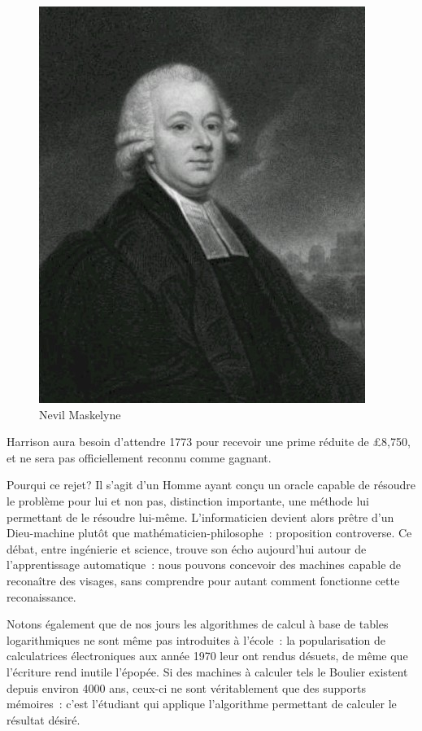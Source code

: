 \begin{minipage}[H]{0.49\linewidth}
  \begin{figure}[H]
  \centering
  \includegraphics[height=0.15\paperheight]{../resources/illustrations/maskelyne}
  \caption{Nevil Maskelyne}
  \end{figure}
\end{minipage}

Harrison aura besoin d'attendre 1773 pour recevoir une prime réduite de \pounds{8,750}, et ne sera pas officiellement reconnu comme gagnant.

Pourqui ce rejet? Il s'agit d'un Homme ayant conçu un \og{}oracle\fg{} capable de résoudre le problème pour lui et non pas, distinction importante, une méthode lui permettant de le résoudre lui-même. L'informaticien devient alors prêtre d'un Dieu-machine plutôt que mathématicien-philosophe~: proposition controverse. Ce débat, entre ingénierie et science, trouve son écho aujourd'hui autour de l'apprentissage automatique~: nous pouvons concevoir des machines capable de reconaître des visages, sans comprendre pour autant comment fonctionne cette reconaissance. 

Notons également que de nos jours les algorithmes de calcul à base de tables logarithmiques ne sont même pas introduites à l'école~: la popularisation de calculatrices électroniques aux année 1970 leur ont rendus désuets, de même que l'écriture rend inutile l'épopée. Si des machines à calculer tels le Boulier existent depuis environ 4000 ans, ceux-ci ne sont véritablement que des supports mémoires~: c'est l'étudiant qui applique l'algorithme permettant de calculer le résultat désiré. 

